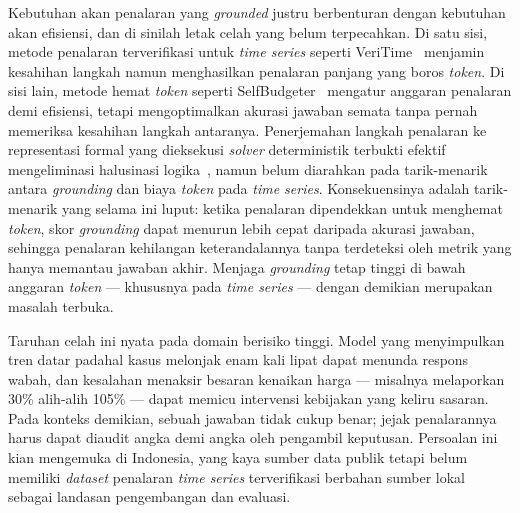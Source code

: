\documentclass[10pt,a4paper,twocolumn]{article}
\begin{document}
Kebutuhan akan penalaran yang \textit{grounded} justru berbenturan dengan
kebutuhan akan efisiensi, dan di sinilah letak celah yang belum terpecahkan. Di
satu sisi, metode penalaran terverifikasi untuk \textit{time series} seperti
VeriTime~\cite{veritime2026} menjamin kesahihan langkah namun menghasilkan
penalaran panjang yang boros \textit{token}. Di sisi lain, metode hemat
\textit{token} seperti SelfBudgeter~\cite{selfbudgeter2025} mengatur anggaran
penalaran demi efisiensi, tetapi mengoptimalkan akurasi jawaban semata tanpa
pernah memeriksa kesahihan langkah antaranya. Penerjemahan langkah penalaran ke
representasi formal yang dieksekusi \textit{solver} deterministik terbukti efektif
mengeliminasi halusinasi logika~\cite{logiclm2023}, namun belum diarahkan pada
tarik-menarik antara \textit{grounding} dan biaya \textit{token} pada
\textit{time series}. Konsekuensinya adalah tarik-menarik yang selama ini luput:
ketika penalaran dipendekkan untuk menghemat \textit{token}, skor \textit{grounding}
dapat menurun lebih cepat daripada akurasi jawaban, sehingga penalaran kehilangan
keterandalannya tanpa terdeteksi oleh metrik yang hanya memantau jawaban akhir.
Menjaga \textit{grounding} tetap tinggi di bawah anggaran \textit{token} ---
khususnya pada \textit{time series} --- dengan demikian merupakan masalah terbuka.

Taruhan celah ini nyata pada domain berisiko tinggi. Model yang menyimpulkan
tren datar padahal kasus melonjak enam kali lipat dapat menunda respons wabah,
dan kesalahan menaksir besaran kenaikan harga --- misalnya melaporkan 30\%
alih-alih 105\% --- dapat memicu intervensi kebijakan yang keliru sasaran. Pada
konteks demikian, sebuah jawaban tidak cukup benar; jejak penalarannya harus
dapat diaudit angka demi angka oleh pengambil keputusan. Persoalan ini kian
mengemuka di Indonesia, yang kaya sumber data publik tetapi belum memiliki
\textit{dataset} penalaran \textit{time series} terverifikasi berbahan sumber
lokal sebagai landasan pengembangan dan evaluasi.
\end{document}
